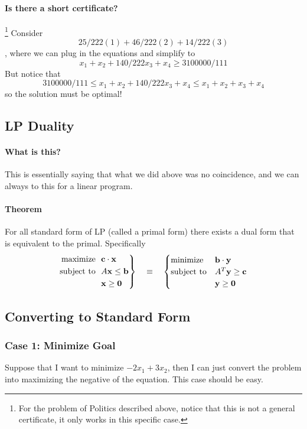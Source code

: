 \documentclass[10pt]{article}
\newcommand{\bx}{\mathbf{x}}
\newcommand{\by}{\mathbf{y}}
\newenvironment{rcases}
  {\left.\begin{aligned}}
  {\end{aligned}\right\rbrace}
\begin{document}
\paragraph{Is there a short certificate?}\footnote{For the problem of Politics described above, notice that this is not a general certificate, it only works in this specific case.}  
Consider $$25/222 (1) + 46/222 (2) + 14/222 (3)$$, where we can plug in the equations and simplify to $$x_1 + x_2 + 140/222  x_3 + x_4 \geq 3100000/111$$
But notice that $$3100000/111 \leq x_1 + x_2 + 140/222  x_3 + x_4 \leq x_1 + x_2 + x_3 + x_4$$ so the solution must be optimal!

\subsection{LP Duality} 
\paragraph{What is this?} This is essentially saying that what we did above was no coincidence, and we can always to this for a linear program. 

\paragraph{Theorem} For all standard form of LP (called a primal form) there exists a dual form that is equivalent to the primal. Specifically
\begin{equation*}
    \begin{rcases}
        \text{maximize~~} &\mathbf{c}\cdot \mathbf{x}\\
        \text{subject to~~} &A\bx \leq \mathbf{b} \\
                        &\bx \geq \mathbf{0}
    \end{rcases}
    \quad \equiv \quad 
    \begin{cases}
        \text{minimize} &\mathbf{b}\cdot \by \\
        \text{subject to} &A^T \by \geq \mathbf{c} \\
                        &\mathbf{y} \geq \mathbf{0}
    \end{cases}
\end{equation*}

\subsection{Converting to Standard Form}
\subsubsection{Case 1: Minimize Goal} Suppose that I want to minimize $-2x_1 + 3x_2$, then I can just convert the problem into maximizing the negative of the equation. This case should be easy.
\end{document}
